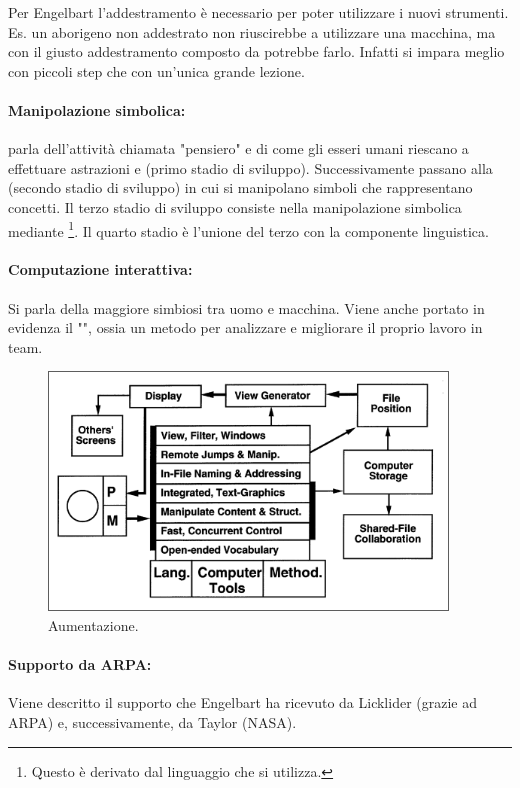Per Engelbart l'addestramento è necessario per poter utilizzare i nuovi strumenti. Es. 
un aborigeno non addestrato non riuscirebbe a utilizzare una macchina, ma con il giusto addestramento composto da 
potrebbe farlo. Infatti si impara meglio con piccoli step che con un'unica grande lezione.

\paragraph{Manipolazione simbolica:} parla dell'attività chiamata "pensiero" e di come gli esseri
umani riescano a effettuare astrazioni e  (primo stadio di sviluppo).
Successivamente passano alla  (secondo stadio di sviluppo) in cui si manipolano
simboli che rappresentano concetti. Il terzo stadio di sviluppo consiste nella manipolazione simbolica mediante \footnote{Questo 
è derivato dal linguaggio che si utilizza.
}. Il quarto stadio è l'unione del terzo con la componente linguistica.

\paragraph{Computazione interattiva:} Si parla della maggiore simbiosi tra uomo e macchina. Viene anche portato in evidenza il
"", ossia un metodo per analizzare e migliorare il proprio lavoro in team.

\begin{figure}[h]
    \centering
    \includegraphics[scale=0.5]{images/Au.png}
    \caption{Aumentazione.}
\end{figure}

\paragraph{Supporto da ARPA:} Viene descritto il supporto che Engelbart ha ricevuto da Licklider (grazie ad ARPA) e, successivamente,
da Taylor (NASA).

